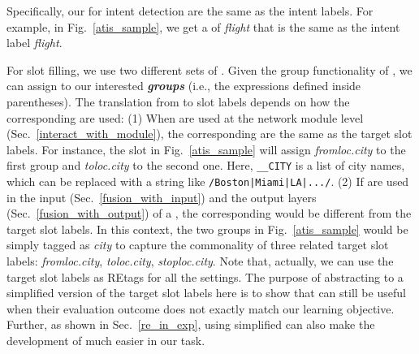 Specifically, our \REtags for intent detection are the same as the intent labels.
For example,  %
in Fig.~\ref{atis_sample},
we get a \REtag of \emph{flight} that is the same as %
 the intent label \emph{flight}.



For slot filling, we use two different sets of \REs. Given the group functionality of \RE, we can assign \REtags to our interested
\textbf{\emph{\RE groups}} (i.e., the expressions defined inside parentheses). The translation from \REtags to slot labels depends
on how the corresponding \REs are used:
(1) When \REs are used at the network module level (Sec.~\ref{interact_with_module}), the corresponding
\REtags are the same as the target slot labels. %
For instance, the slot
\RE in Fig.~\ref{atis_sample} will assign \emph{fromloc.city} to the first \RE group and \emph{toloc.city} to the second one. 
Here,  {\small \texttt{\_\_CITY}} is a list of city names, which can be replaced with a \RE string like
\texttt{\small/Boston|Miami|LA|.../}.
(2) If \REs are used in the input (Sec.~\ref{fusion_with_input}) and the output layers
(Sec.~\ref{fusion_with_output}) of a \NN, the corresponding \REtag would be different from the target slot labels. In this context, the
two \RE groups in Fig.~\ref{atis_sample} would be simply tagged as \emph{city} to capture the commonality of
three related target slot labels: \emph{fromloc.city}, \emph{toloc.city}, \emph{stoploc.city}. 
Note that, actually, we can use the target slot labels as REtags for all the settings.
The purpose of abstracting \REtags to a simplified version of the target slot labels here 
is to
show that
\REs can still be useful when their
evaluation outcome does not exactly match our learning objective.
Further, as shown in Sec.~\ref{re_in_exp}, using simplified \REtags can also make the development of \REs much easier in our task.
%
